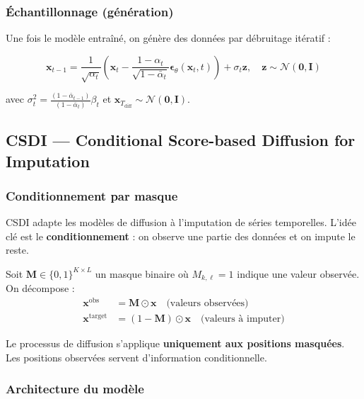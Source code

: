 \documentclass[12pt,a4paper]{article}
\newcommand{\N}{\mathcal{N}}
\newcommand{\bx}{\bm{x}}
\newcommand{\bz}{\bm{z}}
\newcommand{\beps}{\bm{\epsilon}}
\begin{document}
\subsubsection{\'Echantillonnage (g\'en\'eration)}

Une fois le mod\`ele entra\^in\'e, on g\'en\`ere des donn\'ees par d\'ebruitage it\'eratif :

\begin{equation}
\bx_{t-1} = \frac{1}{\sqrt{\alpha_t}}\left(\bx_t - \frac{1-\alpha_t}{\sqrt{1-\bar{\alpha}_t}}\beps_\theta(\bx_t, t)\right) + \sigma_t \bz, \quad \bz \sim \N(\bm{0}, \bm{I})
\label{eq:sampling}
\end{equation}

avec $\sigma_t^2 = \frac{(1-\bar{\alpha}_{t-1})}{(1-\bar{\alpha}_t)} \beta_t$ et $\bx_{T_{\text{diff}}} \sim \N(\bm{0}, \bm{I})$.

\subsection{CSDI --- Conditional Score-based Diffusion for Imputation}

\subsubsection{Conditionnement par masque}

CSDI \cite{tashiro2021} adapte les mod\`eles de diffusion \`a l'imputation de s\'eries temporelles. L'id\'ee cl\'e est le \textbf{conditionnement} : on observe une partie des donn\'ees et on impute le reste.

Soit $\bm{M} \in \{0, 1\}^{K \times L}$ un masque binaire o\`u $M_{k,\ell} = 1$ indique une valeur observ\'ee. On d\'ecompose :
\begin{align}
\bx^{\text{obs}} &= \bm{M} \odot \bx \quad \text{(valeurs observ\'ees)} \\
\bx^{\text{target}} &= (1 - \bm{M}) \odot \bx \quad \text{(valeurs \`a imputer)}
\end{align}

Le processus de diffusion s'applique \textbf{uniquement aux positions masqu\'ees}. Les positions observ\'ees servent d'information conditionnelle.

\subsubsection{Architecture du mod\`ele}
\end{document}
